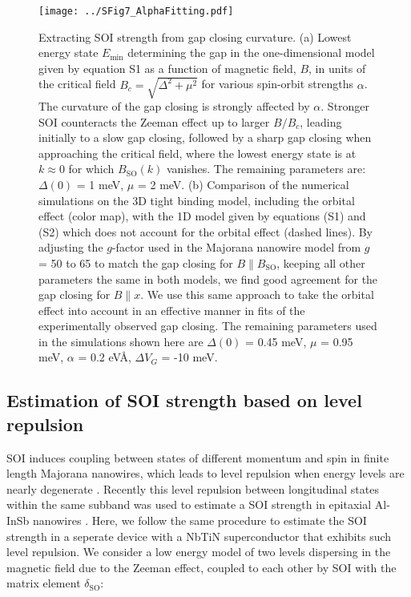 \begin{figure}
\centering
\texttt{[image: ../SFig7\_AlphaFitting.pdf]}
\caption{\label{fig:SOIFit}
    Extracting SOI strength from gap closing curvature.
    (a) Lowest energy state $E_{\mathrm{min}}$ determining the gap in the one-dimensional model given by equation S1 as a function of magnetic field, $B$, in units of the critical field $B_c=\sqrt{\Delta^2+\mu^2}$ for various spin-orbit strengths $\alpha$. The curvature of the gap closing is strongly affected by $\alpha$. Stronger SOI counteracts the Zeeman effect up to larger $B/B_c$, leading initially to a slow gap closing, followed by a sharp gap closing when approaching the critical field, where the lowest energy state is at $k \approx 0$ for which $B_{\mathrm{SO}}(k)$ vanishes. The remaining parameters are: $\Delta(0)$ = 1 meV, $\mu$ = 2 meV. (b) Comparison of the numerical simulations on the 3D tight binding model, including the orbital effect (color map), with the 1D model given by equations (S1) and (S2) which does not account for the orbital effect (dashed lines). By adjusting the $g$-factor used in the Majorana nanowire model from $g$ = 50 to 65 to match the gap closing for $B \parallel B_{\mathrm{SO}}$, keeping all other parameters the same in both models, we find good agreement for the gap closing for $B \parallel x$. We use this same approach to take the orbital effect into account in an effective manner in fits of the experimentally observed gap closing. The remaining parameters used in the simulations shown here are $\Delta(0)$ = 0.45 meV, $\mu$ = 0.95 meV, $\alpha$ = 0.2 eV\AA, $\Delta V_G$ = -10 meV.
}
\end{figure}

\newpage
\subsection{Estimation of SOI strength based on level repulsion}
SOI induces coupling between states of different momentum and spin in finite length Majorana nanowires, which leads to level repulsion when energy levels are nearly degenerate \cite{Stanescu2013}. Recently this level repulsion between longitudinal states within the same subband was used to estimate a SOI strength in epitaxial Al-InSb nanowires \cite{DeMoor2018}. Here, we follow the same procedure to estimate the SOI strength in a seperate device with a NbTiN superconductor that exhibits such level repulsion. We consider a low energy model of two levels dispersing in the magnetic field due to the Zeeman effect, coupled to each other by SOI with the matrix element $\delta_{\mathrm{SO}}$:

